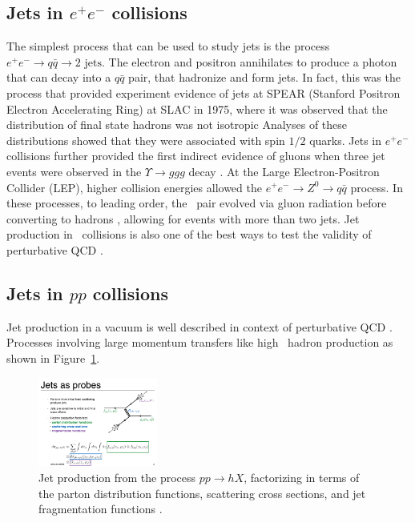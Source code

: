 \subsection{Jets in $e^+ e^-$ collisions}
The simplest process that can be used to study jets is the process $e^+ e^- \rightarrow q \bar{q} \rightarrow 2 \text{ jets}$.
The electron and positron annihilates to produce a photon that can decay into a $q \bar{q}$ pair, that hadronize and form jets.
In fact, this was the process that provided experiment evidence of jets at SPEAR (Stanford Positron Electron Accelerating Ring) at SLAC in 1975, where it was observed that the distribution of final state hadrons was not isotropic \cite{PhysRevLett.35.1609, PhysRevD.26.991} 
Analyses of these distributions showed that they were associated with spin $1/2$ quarks.
Jets in $e^+ e^-$ collisions further provided the first indirect evidence of gluons when three jet events were observed in the $\Upsilon \rightarrow ggg$ decay \cite{Berger:1978rr, Berger:1979cj}. 
At the Large Electron-Positron Collider (LEP), higher collision energies allowed the $e^+ e^- \rightarrow Z^0 \rightarrow q \bar{q}$ process.
In these processes, to leading order, the \qqbar\ pair evolved via gluon radiation before converting to hadrons \cite{Mueller_1991}, allowing for events with more than two jets.
Jet production in \epm\ collisions is also one of the best ways to test the validity of perturbative QCD \cite{Kramer:1986mc}.



\subsection{Jets in $pp$ collisions}
Jet production in a vacuum is well described in context of perturbative QCD \cite{Sjostrand:2007gs}.
Processes involving large momentum transfers like high \pt\ hadron production as shown in Figure~\ref{fig:feynman_jet}.

\begin{figure}[htbp]
\begin{center}
\includegraphics[width=0.35\textwidth]{figures/theory/feynman_jet}
\caption{Jet production from the process $pp \rightarrow hX$, factorizing in terms of the parton distribution functions, scattering cross sections, and jet fragmentation functions \cite{Qin:2015srf}.}
\label{fig:feynman_jet}
\end{center}
\end{figure}

